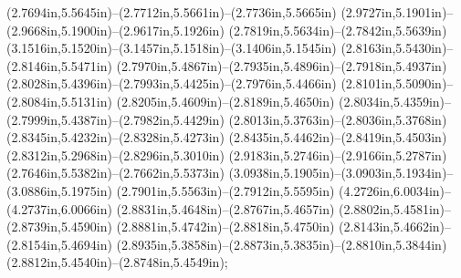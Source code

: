(2.7694in,5.5645in)--(2.7712in,5.5661in)--(2.7736in,5.5665in) (2.9727in,5.1901in)--(2.9668in,5.1900in)--(2.9617in,5.1926in) (2.7819in,5.5634in)--(2.7842in,5.5639in) (3.1516in,5.1520in)--(3.1457in,5.1518in)--(3.1406in,5.1545in) (2.8163in,5.5430in)--(2.8146in,5.5471in) (2.7970in,5.4867in)--(2.7935in,5.4896in)--(2.7918in,5.4937in) (2.8028in,5.4396in)--(2.7993in,5.4425in)--(2.7976in,5.4466in) (2.8101in,5.5090in)--(2.8084in,5.5131in) (2.8205in,5.4609in)--(2.8189in,5.4650in) (2.8034in,5.4359in)--(2.7999in,5.4387in)--(2.7982in,5.4429in) (2.8013in,5.3763in)--(2.8036in,5.3768in) (2.8345in,5.4232in)--(2.8328in,5.4273in) (2.8435in,5.4462in)--(2.8419in,5.4503in) (2.8312in,5.2968in)--(2.8296in,5.3010in) (2.9183in,5.2746in)--(2.9166in,5.2787in) (2.7646in,5.5382in)--(2.7662in,5.5373in) (3.0938in,5.1905in)--(3.0903in,5.1934in)--(3.0886in,5.1975in) (2.7901in,5.5563in)--(2.7912in,5.5595in) (4.2726in,6.0034in)--(4.2737in,6.0066in) (2.8831in,5.4648in)--(2.8767in,5.4657in) (2.8802in,5.4581in)--(2.8739in,5.4590in) (2.8881in,5.4742in)--(2.8818in,5.4750in) (2.8143in,5.4662in)--(2.8154in,5.4694in) (2.8935in,5.3858in)--(2.8873in,5.3835in)--(2.8810in,5.3844in) (2.8812in,5.4540in)--(2.8748in,5.4549in);
